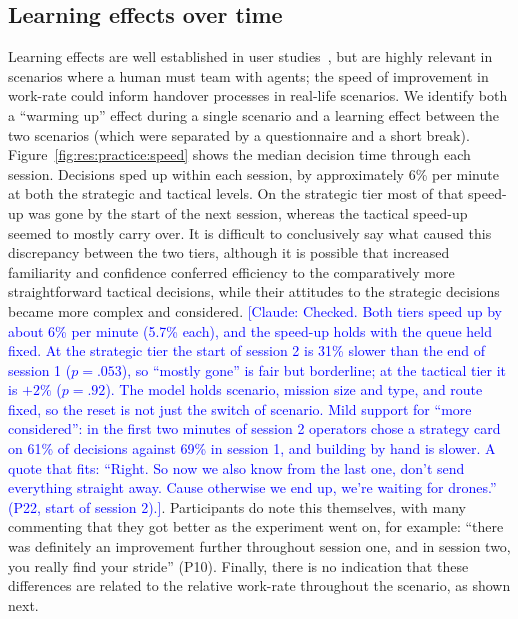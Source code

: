 \subsection{Learning effects over time}\label{sec:res:practice}
Learning effects are well established in user studies~\cite{TODO}, but are highly relevant in scenarios where a human must team with agents; the speed of improvement in work-rate could inform handover processes in real-life scenarios. We identify both a ``warming up'' effect during a single scenario and a learning effect between the two scenarios (which were separated by a questionnaire and a short break). Figure~\ref{fig:res:practice:speed} shows the median decision time through each session. Decisions sped up within each session, by approximately 6\% per minute at both the strategic and tactical levels. On the strategic tier most of that speed-up was gone by the start of the next session, whereas the tactical speed-up seemed to mostly carry over. It is difficult to conclusively say what caused this discrepancy between the two tiers, although it is possible that increased familiarity and confidence conferred efficiency to the comparatively more straightforward tactical decisions, while their attitudes to the strategic decisions became more complex and considered. \textcolor{blue}{[Claude: Checked. Both tiers speed up by about 6\% per minute (5.7\% each), and the speed-up holds with the queue held fixed. At the strategic tier the start of session 2 is 31\% slower than the end of session 1 ($p = .053$), so ``mostly gone'' is fair but borderline; at the tactical tier it is $+2\%$ ($p = .92$). The model holds scenario, mission size and type, and route fixed, so the reset is not just the switch of scenario. Mild support for ``more considered'': in the first two minutes of session 2 operators chose a strategy card on 61\% of decisions against 69\% in session 1, and building by hand is slower. A quote that fits: ``Right. So now we also know from the last one, don't send everything straight away. Cause otherwise we end up, we're waiting for drones.'' (P22, start of session 2).]}. Participants do note this themselves, with many commenting that they got better as the experiment went on, for example: ``there was definitely an improvement further throughout session one, and in session two, you really find your stride'' (P10). Finally, there is no indication that these differences are related to the relative work-rate throughout the scenario, as shown next.

